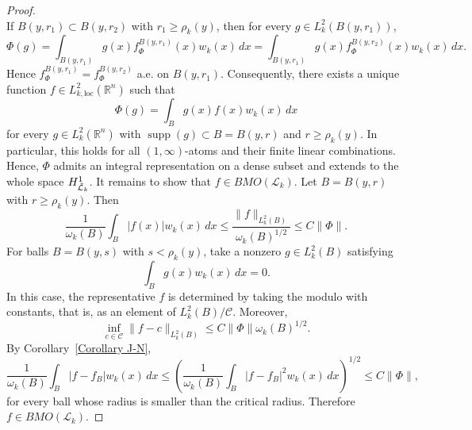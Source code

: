 \documentclass[10pt,a4paper]{amsart}
\begin{document}
\begin{proof}
\[\]
\noindent If $B(y,r_1) \subset B(y,r_2)$ with $r_1 \ge \rho_k(y)$, then for every $g \in L_k^2(B(y,r_1))$,
\[
\Phi(g)
= \int_{B(y,r_1)} g(x) f_\Phi^{B(y,r_1)}(x) w_k(x)\,dx
= \int_{B(y,r_1)} g(x) f_\Phi^{B(y,r_2)}(x) w_k(x)\,dx.
\]
Hence $f_\Phi^{B(y,r_1)} = f_\Phi^{B(y,r_2)}$ a.e. on $B(y,r_1)$. Consequently, there exists a unique function $f \in L_{k,\mathrm{loc}}^2(\mathbb{R}^n)$ such that
\[
\Phi(g) = \int_B g(x) f(x) w_k(x)\,dx
\]
for every $g \in L_k^2(\mathbb{R}^n)$ with $\operatorname{supp}(g)\subset B = B(y,r)$ and $r \ge \rho_k(y)$. In particular, this holds for all $(1,\infty)$-atoms and their finite linear combinations. Hence, $\Phi$ admits an integral representation on a dense subset and extends to the whole space $H_{\Tilde{\mathcal{L}}_k}^1$. It remains to show that $f \in BMO(\mathcal{L}_k)$. Let $B = B(y,r)$ with $r \geq \rho_k(y)$. Then
\[
\frac{1}{\omega_k(B)} \int_B |f(x)| w_k(x)\,dx
\le \frac{\|f\|_{L_k^2(B)}}{\omega_k(B)^{1/2}}
\le C \|\Phi\|.
\]
For balls $B = B(y,s)$ with $s < \rho_k(y)$, take a nonzero $g \in L_k^2(B)$ satisfying
\[
\int_B g(x) w_k(x)\,dx = 0.
\]
In this case, the representative $f$ is determined by taking the modulo with constants, that is, as an element of $L_k^2(B)/\mathcal C$. Moreover,
\[
\inf_{c \in \mathcal C} \|f-c\|_{L_k^2(B)}
\le C \|\Phi\| \omega_k(B)^{1/2}.
\]
By Corollary~\ref{Corollary J-N},
\[
\frac{1}{\omega_k(B)} \int_B |f-f_B| w_k(x)\,dx
\le \left(
\frac{1}{\omega_k(B)} \int_B |f-f_B|^2 w_k(x)\,dx
\right)^{1/2}
\le C \|\Phi\|,
\]
for every ball whose radius is smaller than the critical radius. Therefore $f \in BMO(\mathcal{L}_k)$.
\end{proof}
\end{document}
